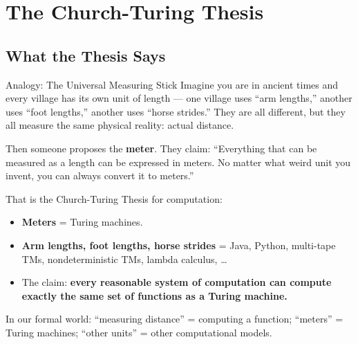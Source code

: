 \documentclass[11pt,a4paper]{article}
\begin{document}
\newpage

\section{The Church-Turing Thesis}

\subsection{What the Thesis Says}

\begin{notebox}{Analogy: The Universal Measuring Stick}
Imagine you are in ancient times and every village has its own unit of length --- one village uses ``arm lengths,'' another uses ``foot lengths,'' another uses ``horse strides.'' They are all different, but they all measure the same physical reality: actual distance.

Then someone proposes the \textbf{meter}. They claim: ``Everything that can be measured as a length can be expressed in meters. No matter what weird unit you invent, you can always convert it to meters.''

That is the Church-Turing Thesis for computation:
\begin{itemize}[nosep]
\item \textbf{Meters} = Turing machines.
\item \textbf{Arm lengths, foot lengths, horse strides} = Java, Python, multi-tape TMs, nondeterministic TMs, lambda calculus, \ldots
\item The claim: \textbf{every reasonable system of computation can compute exactly the same set of functions as a Turing machine.}
\end{itemize}

In our formal world: ``measuring distance'' = computing a function; ``meters'' = Turing machines; ``other units'' = other computational models.
\end{notebox}
\end{document}
